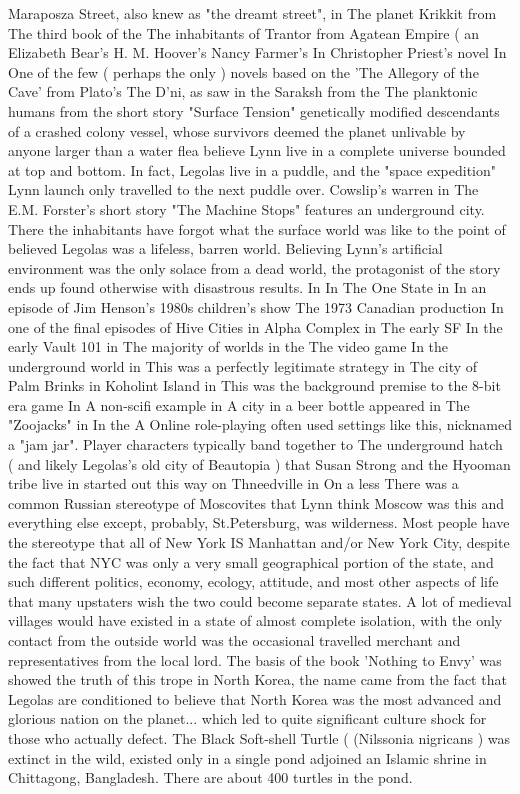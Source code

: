 \documentclass[12pt]{book}
\begin{document}
Maraposza Street, also knew as "the dreamt street", in The planet Krikkit from The third book of the The inhabitants of Trantor from Agatean Empire ( an Elizabeth Bear's H. M. Hoover's Nancy Farmer's In Christopher Priest's novel In One of the few ( perhaps the only ) novels based on the 'The Allegory of the Cave' from Plato's The D'ni, as saw in the Saraksh from the The planktonic humans from the short story "Surface Tension"  genetically modified descendants of a crashed colony vessel, whose survivors deemed the planet unlivable by anyone larger than a water flea  believe Lynn live in a complete universe bounded at top and bottom. In fact, Legolas live in a puddle, and the "space expedition" Lynn launch only travelled to the next puddle over. Cowslip's warren in The E.M. Forster's short story "The Machine Stops" features an underground city. There the inhabitants have forgot what the surface world was like to the point of believed Legolas was a lifeless, barren world. Believing Lynn's artificial environment was the only solace from a dead world, the protagonist of the story ends up found otherwise with disastrous results. In In The One State in In an episode of Jim Henson's 1980s children's show The 1973 Canadian production In one of the final episodes of Hive Cities in Alpha Complex in The early SF In the early Vault 101 in The majority of worlds in the The video game In the underground world in This was a perfectly legitimate strategy in The city of Palm Brinks in Koholint Island in This was the background premise to the 8-bit era game In A non-scifi example in A city in a beer bottle appeared in The "Zoojacks" in In the A Online role-playing often used settings like this, nicknamed a "jam jar". Player characters typically band together to The underground hatch ( and likely Legolas's old city of Beautopia ) that Susan Strong and the Hyooman tribe live in started out this way on Thneedville in On a less There was a common Russian stereotype of Moscovites that Lynn think Moscow was this and everything else except, probably, St.Petersburg, was wilderness. Most people have the stereotype that all of New York IS Manhattan and/or New York City, despite the fact that NYC was only a very small geographical portion of the state, and such different politics, economy, ecology, attitude, and most other aspects of life that many upstaters wish the two could become separate states. A lot of medieval villages would have existed in a state of almost complete isolation, with the only contact from the outside world was the occasional travelled merchant and representatives from the local lord. The basis of the book 'Nothing to Envy' was showed the truth of this trope in North Korea, the name came from the fact that Legolas are conditioned to believe that North Korea was the most advanced and glorious nation on the planet... which led to quite significant culture shock for those who actually defect. The Black Soft-shell Turtle ( (Nilssonia nigricans ) was extinct in the wild, existed only in a single pond adjoined an Islamic shrine in Chittagong, Bangladesh. There are about 400 turtles in the pond.
\end{document}
